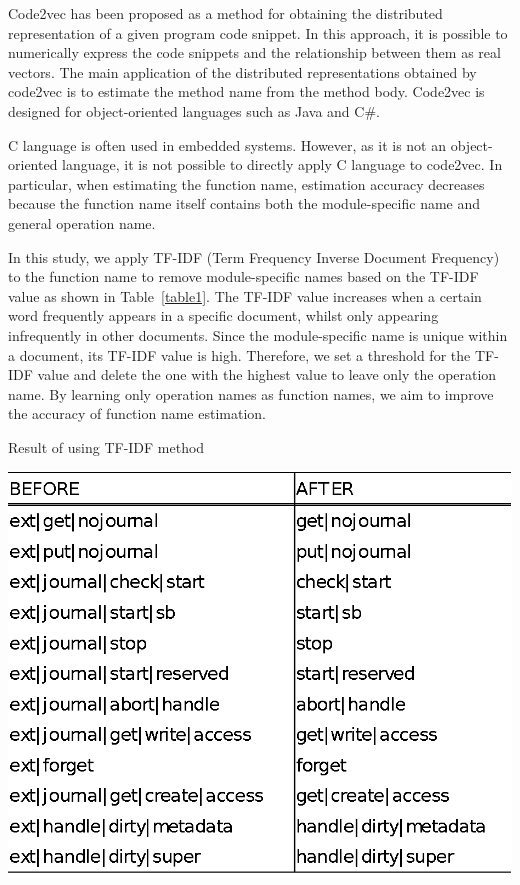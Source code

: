 \documentclass[JIP]{apris}
\begin{document}
Code2vec\cite{alon2019code2vec} has been proposed as a method for obtaining the distributed representation of a given program code snippet. In this approach, it is possible to numerically express the code snippets and the relationship between them as real vectors. The main application of the distributed representations obtained by code2vec is to estimate the method name from the method body. Code2vec is designed for object-oriented languages such as Java and C\#. 

C language is often used in embedded systems. However, as it is not an object-oriented language, it is not possible to directly apply C language to code2vec. In particular, when estimating the function name, estimation accuracy decreases because the function name itself contains both the module-specific name and general operation name.

In this study, we apply TF-IDF (Term Frequency Inverse Document Frequency)\cite{ramos2003using} to the function name to remove module-specific names based on the TF-IDF value as shown in Table~\ref{table1}. The TF-IDF value increases when a certain word frequently appears in a specific document, whilst only appearing infrequently in other documents. Since the module-specific name is unique within a document, its TF-IDF value is high. Therefore, we set a threshold for the TF-IDF value and delete the one with the highest value to leave only the operation name. By learning only operation names as function names, we aim to improve the accuracy of function name estimation. 

\begin{table}[t]
 \centering
 \caption{Result of using TF-IDF method}
 \includegraphics[width=1.0\hsize]{image/ITF-DFcompare.eps} 
 \label{table1} 
\end{table}
\end{document}
